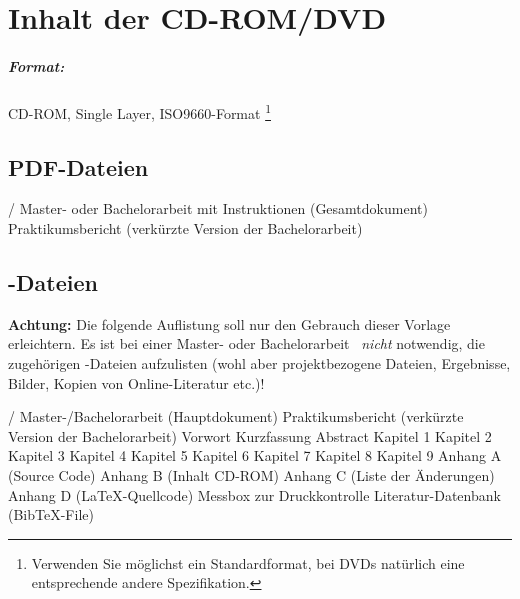 \chapter{Inhalt der CD-ROM/DVD}
\label{app:cdrom}

\paragraph{Format:} 
		CD-ROM, Single Layer, ISO9660-Format%
\footnote{Verwenden Sie möglichst ein Standardformat, bei DVDs natürlich
eine entsprechende andere Spezifikation.}


\section{PDF-Dateien}
\begin{FileList}{/}
 Master- oder Bachelorarbeit mit Instruktionen (Gesamtdokument)
 Praktikumsbericht (verkürzte Version der Bachelorarbeit) %
\end{FileList}


\section{\latex-Dateien}

\textbf{Achtung:} Die folgende Auflistung soll nur den Gebrauch dieser Vorlage erleichtern. Es ist bei einer Master- oder Bachelorarbeit \ia\ \emph{nicht} notwendig, die zugehörigen \latex-Dateien aufzulisten (wohl aber projektbezogene Dateien, Ergebnisse, Bilder, Kopien von Online-Literatur etc.)!

\begin{FileList}{/}
 Master-/Bachelorarbeit (Hauptdokument) %
 Praktikumsbericht (verkürzte Version der Bachelorarbeit) %
 Vorwort %
 Kurzfassung %
 Abstract %
 Kapitel 1 %
 Kapitel 2 %
 Kapitel 3
 Kapitel 4 %
 Kapitel 5 %
 Kapitel 6 %
 Kapitel 7 %
 Kapitel 8 %
 Kapitel 9 %
 Anhang A (Source Code) %
 Anhang B (Inhalt CD-ROM) %
 Anhang C (Liste der Änderungen) %
 Anhang D (LaTeX-Quellcode) %
 Messbox zur Druckkontrolle %
 Literatur-Datenbank (BibTeX-File)
\end{FileList}

